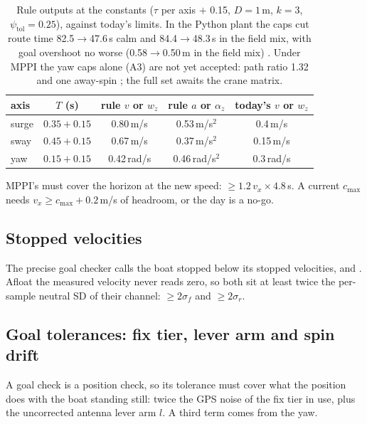 \begin{table}[h]
\centering\small
\begin{tabular}{@{}lcccc@{}}
\toprule
axis & $T$ (s) & rule $v$ or $w_z$ & rule $a$ or $\alpha_z$ & today's $v$ or $w_z$ \\
\midrule
surge & $0.35 + 0.15$ & 0.80\,m/s & 0.53\,m/s$^2$ & 0.4\,m/s \\
sway  & $0.45 + 0.15$ & 0.67\,m/s & 0.37\,m/s$^2$ & 0.15\,m/s \\
yaw   & $0.15 + 0.15$ & 0.42\,rad/s & 0.46\,rad/s$^2$ & 0.3\,rad/s \\
\bottomrule
\end{tabular}
\caption{Rule outputs at the  constants ($\tau$ per axis $+$  0.15,
$D = 1$\,m, $k = 3$, $\psi_\text{tol} = 0.25$), against today's limits. In the Python plant the caps
cut route time 82.5$\to$47.6\,s calm and 84.4$\to$48.3\,s in the field mix, with goal overshoot
no worse (0.58$\to$0.50\,m in the field mix) . Under MPPI the yaw caps alone (A3) are not yet accepted:
path ratio 1.32 and one away-spin ; the full set awaits the crane matrix.}
\label{tab:rules}
\end{table}

\noindent MPPI's  must cover the horizon at the new speed:
$\ge 1.2\,v_x \times 4.8$\,s. A current $c_\text{max}$ needs $v_x \ge c_\text{max} + 0.2$\,m/s of
headroom, or the day is a no-go.



\subsection{Stopped velocities}
The precise goal checker calls the boat stopped below its stopped velocities,
 and . Afloat the measured velocity never reads zero, so both sit at
least twice the per-sample neutral SD of their channel: $\ge 2\sigma_f$ and $\ge 2\sigma_r$.

\subsection{Goal tolerances: fix tier, lever arm and spin drift}
\label{sec:spin}
A goal check is a position check, so its tolerance must cover what the position does with the
boat standing still: twice the GPS noise of the fix tier in use, plus the uncorrected antenna
lever arm $l$. A third term comes from the yaw.

